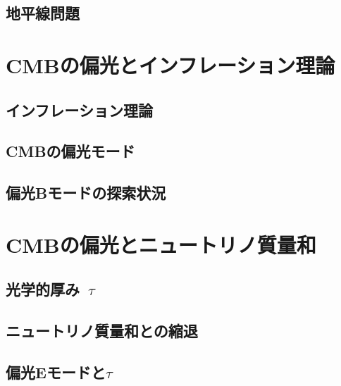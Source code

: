 \subsection{地平線問題}

\section{CMBの偏光とインフレーション理論}

\subsection{インフレーション理論}

\subsection{CMBの偏光モード}

\subsection{偏光Bモードの探索状況}

\section{CMBの偏光とニュートリノ質量和}

\subsection{光学的厚み~$\tau$}

\subsection{ニュートリノ質量和との縮退}

\subsection{偏光Eモードと$\tau$}
\label{E_and_tau}
